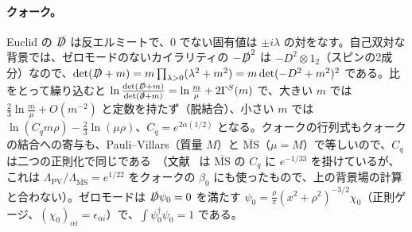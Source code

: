 \documentclass[a4paper,10pt]{ltjsarticle}
\newcommand{\MSbar}{\overline{\mathrm{MS}}}
\begin{document}
\paragraph{クォーク。}Euclid の $\slashed D$ は反エルミートで、0 でない固有値は $\pm i\lambda$ の対をなす。自己双対な背景では、ゼロモードのないカイラリティの $-\slashed D^2$ は $-D^2\otimes1_2$（スピンの2成分）なので、$\det(\slashed D+m)=m\prod_{\lambda>0}(\lambda^2+m^2)=m\det(-D^2+m^2)^2$ である。比をとって繰り込むと $\ln\frac{\det(\slashed D+m)}{\det(\slashed\partial+m)}=\ln\frac m\mu+2\Gamma^S(m)$ で、大きい $m$ では $\frac23\ln\frac m\mu+O(m^{-2})$ と定数を持たず（脱結合）、小さい $m$ では $\ln(C_qm\rho)-\frac23\ln(\mu\rho)$、$C_q=e^{2\alpha(1/2)}$ となる。クォークの行列式もクォークの結合への寄与も、Pauli--Villars（質量 $M$）と $\MSbar$（$\mu=M$）で等しいので、$C_q$ は二つの正則化で同じである~\cite{thooft86,np94}（文献~\cite{bn20,fm25} は $\MSbar$ の $C_q$ に $e^{-1/33}$ を掛けているが、これは $\Lambda_{\mathrm{PV}}/\Lambda_{\MSbar}=e^{1/22}$ をクォークの $\beta_0$ にも使ったもので、上の背景場の計算と合わない）。ゼロモードは $\slashed D\psi_0=0$ を満たす $\psi_0=\frac\rho\pi(x^2+\rho^2)^{-3/2}\chi_0$（正則ゲージ、$(\chi_0)_{\alpha i}=\epsilon_{\alpha i}$）で、$\int\psi_0^\dagger\psi_0=1$ である。
\end{document}
